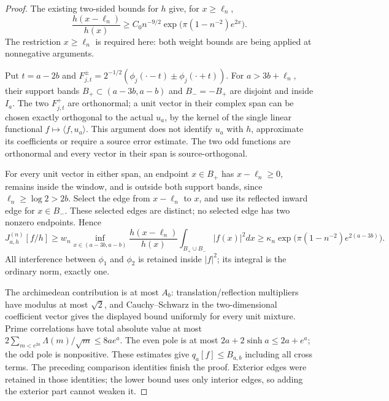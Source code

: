 \documentclass[11pt]{article}
\theoremstyle{remark}
\begin{document}
\begin{proof}
The existing two-sided bounds for $h$ give, for $x\ge\ell_n$,
\[
 \frac{h(x-\ell_n)}{h(x)}
 \ge C_0 n^{-9/2}
             \exp\!\bigl(\pi(1-n^{-2})e^{2x}\bigr).
\]
The restriction $x\ge\ell_n$ is required here: both weight bounds
are being applied at nonnegative arguments.

Put $t=a-2b$ and
$F_{j,t}^{\pm}=2^{-1/2}(\phi_j(\cdot-t)\pm\phi_j(\cdot+t))$.
For $a>3b+\ell_n$, their support bands
$B_+\subset(a-3b,a-b)$ and $B_-=-B_+$ are disjoint and inside $I_a$.
The two $F_{j,t}^+$ are orthonormal; a unit vector in their complex
span can be chosen exactly orthogonal to the actual $u_a$, by the
kernel of the single linear functional $f\mapsto\langle f,u_a\rangle$.
This argument does not identify $u_a$ with $h$, approximate its
coefficients or require a source error estimate. The two odd functions
are orthonormal and every vector in their span is source-orthogonal.

For every unit vector in either span, an endpoint $x\in B_+$ has
$x-\ell_n\ge0$, remains inside the window, and is outside both support
bands, since $\ell_n\ge\log2>2b$. Select the edge from $x-\ell_n$ to
$x$, and use its reflected inward edge for $x\in B_-$. These selected
edges are distinct; no selected edge has two nonzero endpoints. Hence
\[
 J^{(n)}_{a,h}[f/h]
 \ge w_n\inf_{x\in(a-3b,a-b)}\frac{h(x-\ell_n)}{h(x)}
             \int_{B_+\cup B_-}|f(x)|^2dx
 \ge\kappa_n\exp\!\bigl(\pi(1-n^{-2})e^{2(a-3b)}\bigr).
\]
All interference between $\phi_1$ and $\phi_2$ is retained inside
$|f|^2$; its integral is the ordinary norm, exactly one.

The archimedean contribution is at most $A_b$: translation/reflection
multipliers have modulus at most $\sqrt2$, and Cauchy--Schwarz in the
two-dimensional coefficient vector gives the displayed bound uniformly
for every unit mixture. Prime correlations have total absolute value
at most $2\sum_{m<e^{2a}}\Lambda(m)/\sqrt m\le8ae^a$.
The even pole is at most $2a+2\sinh a\le2a+e^a$; the odd pole is
nonpositive. These estimates give $q_a[f]\le B_{a,b}$ including all
cross terms. The preceding comparison identities finish the proof.
Exterior edges were retained in those identities; the lower bound uses
only interior edges, so adding the exterior part cannot weaken it.
\end{proof}
\end{document}
